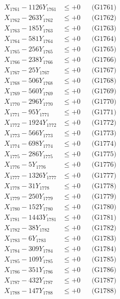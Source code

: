 \documentclass[a4paper,10pt]{article}
\begin{document}
{\begin{align}
\allowbreak
X_{1761} - 1126Y_{1761} &\leq +0 && \text{(G1761)} \\
X_{1762} - 263Y_{1762} &\leq +0 && \text{(G1762)} \\
X_{1763} - 185Y_{1763} &\leq +0 && \text{(G1763)} \\
X_{1764} - 581Y_{1764} &\leq +0 && \text{(G1764)} \\
X_{1765} - 256Y_{1765} &\leq +0 && \text{(G1765)} \\
X_{1766} - 238Y_{1766} &\leq +0 && \text{(G1766)} \\
X_{1767} - 25Y_{1767} &\leq +0 && \text{(G1767)} \\
X_{1768} - 506Y_{1768} &\leq +0 && \text{(G1768)} \\
X_{1769} - 560Y_{1769} &\leq +0 && \text{(G1769)} \\
X_{1770} - 296Y_{1770} &\leq +0 && \text{(G1770)} \\
\allowbreak
X_{1771} - 95Y_{1771} &\leq +0 && \text{(G1771)} \\
X_{1772} - 1924Y_{1772} &\leq +0 && \text{(G1772)} \\
X_{1773} - 566Y_{1773} &\leq +0 && \text{(G1773)} \\
X_{1774} - 698Y_{1774} &\leq +0 && \text{(G1774)} \\
X_{1775} - 286Y_{1775} &\leq +0 && \text{(G1775)} \\
X_{1776} - 5Y_{1776} &\leq +0 && \text{(G1776)} \\
X_{1777} - 1326Y_{1777} &\leq +0 && \text{(G1777)} \\
X_{1778} - 31Y_{1778} &\leq +0 && \text{(G1778)} \\
X_{1779} - 250Y_{1779} &\leq +0 && \text{(G1779)} \\
X_{1780} - 152Y_{1780} &\leq +0 && \text{(G1780)} \\
\allowbreak
X_{1781} - 1443Y_{1781} &\leq +0 && \text{(G1781)} \\
X_{1782} - 38Y_{1782} &\leq +0 && \text{(G1782)} \\
X_{1783} - 6Y_{1783} &\leq +0 && \text{(G1783)} \\
X_{1784} - 309Y_{1784} &\leq +0 && \text{(G1784)} \\
X_{1785} - 109Y_{1785} &\leq +0 && \text{(G1785)} \\
X_{1786} - 351Y_{1786} &\leq +0 && \text{(G1786)} \\
X_{1787} - 432Y_{1787} &\leq +0 && \text{(G1787)} \\
X_{1788} - 147Y_{1788} &\leq +0 && \text{(G1788)} \\

\end{align}}
\end{document}
